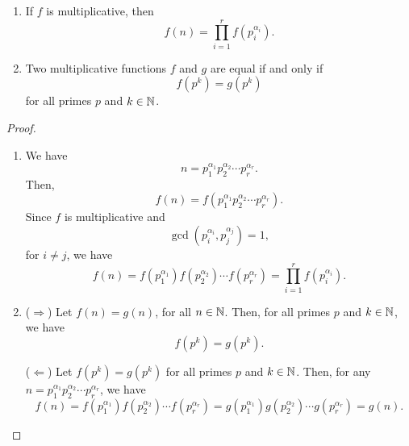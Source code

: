 \begin{theorem}
    \begin{enumerate}
        \item If $f$ is multiplicative, then \[f(n) = \prod_{i=1}^r f(p_i^{\alpha_i}).\]
        \item Two multiplicative functions $f$ and $g$ are equal if and only if \[f(p^k) = g(p^k)\] for all primes $p$ and $k \in \mathbb{N}$.
    \end{enumerate}
\end{theorem}
\begin{proof}
    \begin{enumerate}
        \item We have \[n = p_1^{\alpha_1} p_2^{\alpha_2} \cdots p_r^{\alpha_r}.\] Then, \[f(n) = f(p_1^{\alpha_1} p_2^{\alpha_2} \cdots p_r^{\alpha_r}).\] Since $f$ is multiplicative and \[\gcd(p_i^{\alpha_i}, p_j^{\alpha_j}) = 1,\] for $i \neq j$, we have \[f(n) = f(p_1^{\alpha_1}) f(p_2^{\alpha_2}) \cdots f(p_r^{\alpha_r}) = \prod_{i=1}^r f(p_i^{\alpha_i}).\]
        \item ($\Rightarrow$) Let $f(n) = g(n)$, for all $n \in \mathbb{N}$. Then, for all primes $p$ and $k \in \mathbb{N}$, we have \[f(p^k) = g(p^k).\]

        ($\Leftarrow$) Let $f(p^k) = g(p^k)$ for all primes $p$ and $k \in \mathbb{N}$. Then, for any $n = p_1^{\alpha_1} p_2^{\alpha_2} \cdots p_r^{\alpha_r}$, we have \[f(n) = f(p_1^{\alpha_1}) f(p_2^{\alpha_2}) \cdots f(p_r^{\alpha_r}) = g(p_1^{\alpha_1}) g(p_2^{\alpha_2}) \cdots g(p_r^{\alpha_r}) = g(n).\]
    \end{enumerate}
\end{proof}

